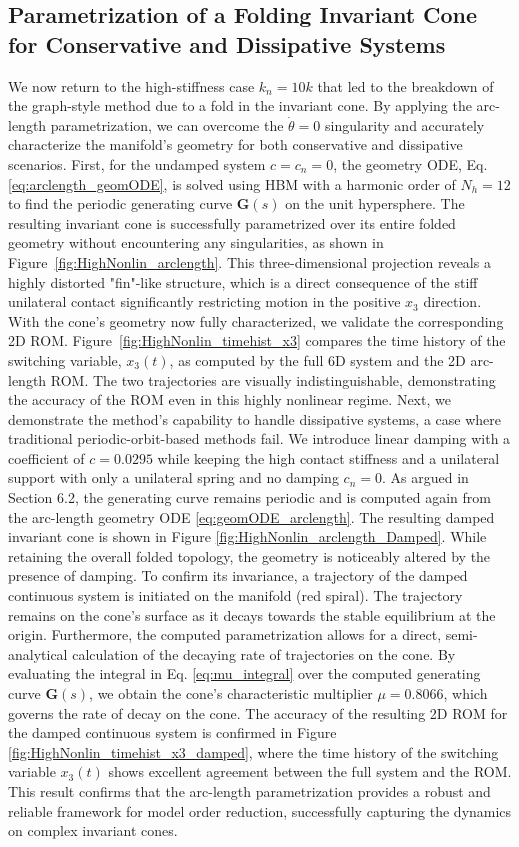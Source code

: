 \documentclass[a4paper,9pt,parskip=half,english]{article}
\theoremstyle{plain}
\theoremstyle{definition}
\newcommand{\vG}{\mathbf G}
\begin{document}
\subsection{Parametrization of a Folding Invariant Cone for Conservative and Dissipative Systems}
We now return to the high-stiffness case $k_n=10 k$ that led to the breakdown of the graph-style method due to a fold in the invariant cone. By applying the arc-length parametrization, we can overcome the $\dot{\theta}=0$ singularity and accurately characterize the manifold's geometry for both conservative and dissipative scenarios. First, for the undamped system $c=c_n=0$, the geometry ODE, Eq. \eqref{eq:arclength_geomODE}, is solved using HBM with a harmonic order of $N_h=12$ to find the periodic generating curve $\vG(s)$ on the unit hypersphere. The resulting invariant cone is successfully parametrized over its entire folded geometry without encountering any singularities, as shown in Figure~\ref{fig:HighNonlin_arclength}. This three-dimensional projection reveals a highly distorted "fin"-like structure, which is a direct consequence of the stiff unilateral contact significantly restricting motion in the positive $x_3$ direction. With the cone's geometry now fully characterized, we validate the corresponding 2D ROM. Figure~\ref{fig:HighNonlin_timehist_x3} compares the time history of the switching variable, $x_3(t)$, as computed by the full 6D system and the 2D arc-length ROM. The two trajectories are visually indistinguishable, demonstrating the accuracy of the ROM even in this highly nonlinear regime. Next, we demonstrate the method's capability to handle dissipative systems, a case where traditional periodic-orbit-based methods fail. We introduce linear damping with a coefficient of $c=0.0295$ while keeping the high contact stiffness and a unilateral support with only a unilateral spring and no damping $c_n=0$. As argued in Section 6.2, the generating curve remains periodic and is computed again from the arc-length geometry ODE \eqref{eq:geomODE_arclength}. The resulting damped invariant cone is shown in Figure \ref{fig:HighNonlin_arclength_Damped}. While retaining the overall folded topology, the geometry is noticeably altered by the presence of damping. To confirm its invariance, a trajectory of the damped continuous system is initiated on the manifold (red spiral). The trajectory remains on the cone's surface as it decays towards the stable equilibrium at the origin. Furthermore, the computed parametrization allows for a direct, semi-analytical calculation of the decaying rate of trajectories on the cone. By evaluating the integral in Eq. \eqref{eq:mu_integral} over the computed generating curve $\vG(s)$, we obtain the cone's characteristic multiplier $\mu=0.8066$, which governs the rate of decay on the cone. The accuracy of the resulting 2D ROM for the damped continuous system is confirmed in Figure \ref{fig:HighNonlin_timehist_x3_damped}, where the time history of the switching variable $x_3(t)$ shows excellent agreement between the full system and the ROM. This result confirms that the arc-length parametrization provides a robust and reliable framework for model order reduction, successfully capturing the dynamics on complex invariant cones. 
\end{document}

